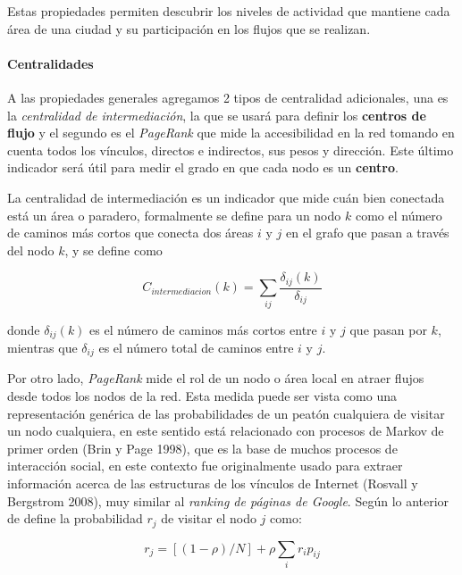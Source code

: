 \documentclass[12pt]{article}
\begin{document}
Estas propiedades permiten descubrir los niveles de actividad que mantiene cada área de una ciudad y su participación en los flujos que se realizan.

	\paragraph{Centralidades}
	
	A las propiedades generales agregamos 2 tipos de centralidad adicionales, una es la \textit{centralidad de intermediación}, la que se usará para definir los \textbf{centros de flujo} y el segundo es el \textit{PageRank} que mide la accesibilidad en la red tomando en cuenta todos los vínculos, directos e indirectos, sus pesos y dirección. Este último indicador será útil para medir el grado en que cada nodo es un \textbf{centro}.
	
	La centralidad de intermediación es un indicador que mide cuán bien conectada está un área o paradero, formalmente se define para un nodo $k$ como el número de caminos más cortos que conecta dos áreas $i$ y $j$ en el grafo que pasan a través del nodo $k$, y se define como
	
$$
	C_{intermediacion}(k) = \sum_{ij} \frac{\delta_{ij} (k)}{\delta_{ij}}
$$

donde $\delta_{ij}(k)$ es el número de caminos más cortos entre $i$ y $j$ que pasan por $k$, mientras que $\delta_{ij}$ es el número total de caminos entre $i$ y $j$. 

Por otro lado, \textit{PageRank} mide el rol de un nodo o área local en atraer flujos desde todos los nodos de la red. Esta medida puede ser vista como una representación genérica de las probabilidades de un peatón cualquiera de visitar un nodo cualquiera, en este sentido está relacionado con procesos de Markov de primer orden (Brin y Page 1998)\cite{markov}, que es la base de muchos procesos de interacción social, en este contexto  fue originalmente usado para extraer información acerca de las estructuras de los vínculos de Internet (Rosvall y Bergstrom 2008)\cite{Infomap}, muy similar al \textit{ranking de páginas de Google}. Según lo anterior de define la probabilidad $r_j$ de visitar el nodo $j$ como:

$$
	r_j = [(1-\rho)/N]+\rho\sum_i r_ip_{ij}
$$
\end{document}

